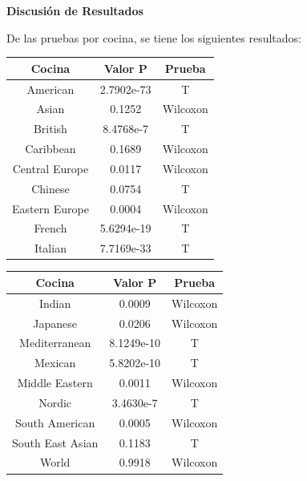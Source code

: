 \documentclass[12pt,a4paper]{article}
\begin{document}
        \textbf{Discusión de Resultados}\\
        {
            De las pruebas por cocina, se tiene los siguientes resultados:
            \begin{center}
                \begin{tabular}{| c | c | c |}
                    \toprule
                    \textbf{Cocina} & \textbf{Valor P} & \textbf{Prueba} \\
                    \midrule
                    American & 2.7902e-73 & T \\
                    Asian & 0.1252 & Wilcoxon \\
                    British & 8.4768e-7 & T \\
                    Caribbean & 0.1689 & Wilcoxon \\
                    Central Europe & 0.0117 & Wilcoxon \\
                    Chinese & 0.0754 & T \\
                    Eastern Europe & 0.0004 & Wilcoxon \\
                    French & 5.6294e-19 & T \\
                    Italian & 7.7169e-33 & T \\
                    \bottomrule
                \end{tabular}
                \begin{tabular}{| c | c | c |}
                    \toprule
                    \textbf{Cocina} & \textbf{Valor P} & \textbf{Prueba} \\
                    \midrule
                    Indian & 0.0009 & Wilcoxon \\
                    Japanese & 0.0206 & Wilcoxon \\
                    Mediterranean & 8.1249e-10 & T \\
                    Mexican & 5.8202e-10 & T \\
                    Middle Eastern & 0.0011 & Wilcoxon \\
                    Nordic & 3.4630e-7 & T \\
                    South American & 0.0005 & Wilcoxon \\
                    South East Asian & 0.1183 & T \\
                    World & 0.9918 & Wilcoxon \\
                    \bottomrule
                \end{tabular}
            \end{center}

}
\end{document}
